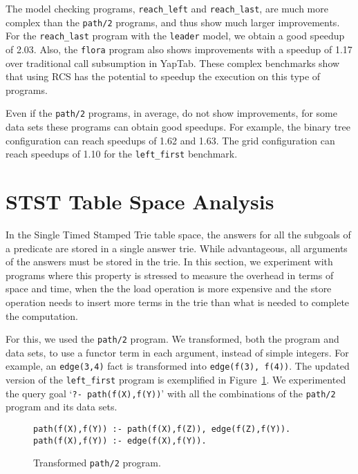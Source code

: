 The model checking programs, \texttt{reach\_left} and \texttt{reach\_last}, are much more complex than the \texttt{path/2}
programs, and thus show much larger improvements. For the \texttt{reach\_last} program with the \texttt{leader} model,
we obtain a good speedup of 2.03. Also, the \texttt{flora} program also shows improvements with a speedup of 1.17 over
traditional call subsumption in YapTab. These complex benchmarks show that using RCS has the potential to speedup the
execution on this type of programs.

Even if the \texttt{path/2} programs, in average, do not show improvements, for some data sets
these programs can obtain good speedups. For example, the binary tree configuration can reach speedups of 1.62 and 1.63. The grid configuration can reach speedups of 1.10 for the \texttt{left\_first} benchmark.




\section{STST Table Space Analysis}

In the Single Timed Stamped Trie table space, the answers for all the subgoals
of a predicate are stored in a single answer trie. While advantageous, all arguments of
the answers must be stored in the trie. In this section, we experiment with programs
where this property is stressed to measure the overhead in terms of space and time, when
the the load operation is more expensive and the store operation needs to insert more terms in
the trie than what is needed to complete the computation.

For this, we used the \texttt{path/2} program. We transformed, both the program and data sets,
to use a functor term in each argument, instead of simple integers. For example, an
\texttt{edge(3,4)} fact is transformed into \texttt{edge(f(3), f(4))}. The updated version
of the \texttt{left\_first} program is exemplified in Figure~\ref{fig:converted_path}.
We experimented the query goal `\texttt{?-~path(f(X),f(Y))}' with all the combinations of
the \texttt{path/2} program and its data sets.

\begin{figure}[ht]
\begin{Verbatim}
path(f(X),f(Y)) :- path(f(X),f(Z)), edge(f(Z),f(Y)).
path(f(X),f(Y)) :- edge(f(X),f(Y)).
\end{Verbatim}
\caption{Transformed \texttt{path/2} program.}
\label{fig:converted_path}
\end{figure}

